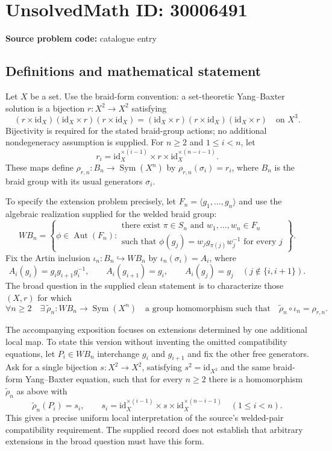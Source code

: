 \documentclass[11pt]{article}
\begin{document}
\section*{UnsolvedMath ID: 30006491}
\textbf{Source problem code:} catalogue entry
\subsection{Definitions and mathematical statement}
Let \(X\) be a set. Use the braid-form convention: a set-theoretic Yang--Baxter solution is a bijection \(r\colon X^2\to X^2\) satisfying
\[
(r\times\mathrm{id}_X)(\mathrm{id}_X\times r)(r\times\mathrm{id}_X)
=
(\mathrm{id}_X\times r)(r\times\mathrm{id}_X)(\mathrm{id}_X\times r)
\quad\text{on }X^3.
\]
Bijectivity is required for the stated braid-group actions; no additional nondegeneracy assumption is supplied. For \(n\geq2\) and \(1\leq i<n\), let
\[
r_i=\mathrm{id}_X^{\times(i-1)}\times r\times\mathrm{id}_X^{\times(n-i-1)}.
\]
These maps define \(\rho_{r,n}\colon B_n\to\operatorname{Sym}(X^n)\) by \(\rho_{r,n}(\sigma_i)=r_i\), where \(B_n\) is the braid group with its usual generators \(\sigma_i\).

To specify the extension problem precisely, let \(F_n=\langle g_1,\ldots,g_n\rangle\) and use the algebraic realization supplied for the welded braid group:
\[
WB_n=\left\{\phi\in\operatorname{Aut}(F_n):
\begin{array}{l}
\text{there exist }\pi\in S_n\text{ and }w_1,\ldots,w_n\in F_n\\
\text{such that }\phi(g_j)=w_jg_{\pi(j)}w_j^{-1}\text{ for every }j
\end{array}\right\}.
\]
Fix the Artin inclusion \(\iota_n\colon B_n\hookrightarrow WB_n\) by \(\iota_n(\sigma_i)=A_i\), where
\[
A_i(g_i)=g_ig_{i+1}g_i^{-1},\qquad
A_i(g_{i+1})=g_i,\qquad
A_i(g_j)=g_j\quad(j\notin\{i,i+1\}).
\]
The broad question in the supplied clean statement is to characterize those \((X,r)\) for which
\[
\forall n\geq2\quad\exists\ \widetilde\rho_n\colon WB_n\longrightarrow\operatorname{Sym}(X^n)
\quad\text{a group homomorphism such that}\quad
\widetilde\rho_n\circ\iota_n=\rho_{r,n}.
\]

The accompanying exposition focuses on extensions determined by one additional local map. To state this version without inventing the omitted compatibility equations, let \(P_i\in WB_n\) interchange \(g_i\) and \(g_{i+1}\) and fix the other free generators. Ask for a single bijection \(s\colon X^2\to X^2\), satisfying \(s^2=\mathrm{id}_{X^2}\) and the same braid-form Yang--Baxter equation, such that for every \(n\geq2\) there is a homomorphism \(\widetilde\rho_n\) as above with
\[
\widetilde\rho_n(P_i)=s_i,
\qquad
s_i=\mathrm{id}_X^{\times(i-1)}\times s\times\mathrm{id}_X^{\times(n-i-1)}
\quad(1\leq i<n).
\]
This gives a precise uniform local interpretation of the source's welded-pair compatibility requirement. The supplied record does not establish that arbitrary extensions in the broad question must have this form.
\end{document}
